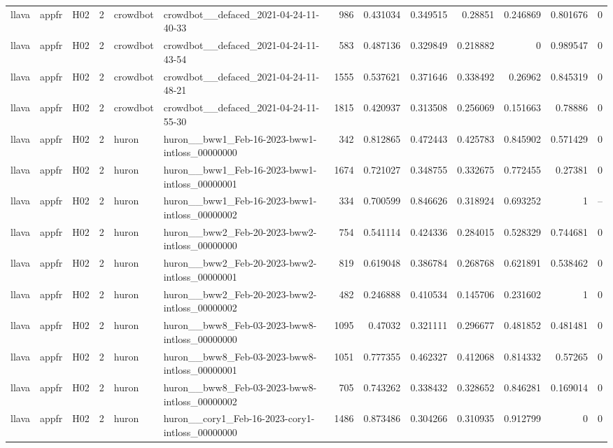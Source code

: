 \begin{longtable}{lllrllrrrrrrr}
llava & appfr & H02 & 2 & crowdbot & crowdbot\_\_defaced\_2021-04-24-11-40-33 & 986 & 0.431034 & 0.349515 & 0.28851 & 0.246869 & 0.801676 & 0 \\
llava & appfr & H02 & 2 & crowdbot & crowdbot\_\_defaced\_2021-04-24-11-43-54 & 583 & 0.487136 & 0.329849 & 0.218882 & 0 & 0.989547 & 0 \\
llava & appfr & H02 & 2 & crowdbot & crowdbot\_\_defaced\_2021-04-24-11-48-21 & 1555 & 0.537621 & 0.371646 & 0.338492 & 0.26962 & 0.845319 & 0 \\
llava & appfr & H02 & 2 & crowdbot & crowdbot\_\_defaced\_2021-04-24-11-55-30 & 1815 & 0.420937 & 0.313508 & 0.256069 & 0.151663 & 0.78886 & 0 \\
llava & appfr & H02 & 2 & huron & huron\_\_bww1\_Feb-16-2023-bww1-intloss\_00000000 & 342 & 0.812865 & 0.472443 & 0.425783 & 0.845902 & 0.571429 & 0 \\
llava & appfr & H02 & 2 & huron & huron\_\_bww1\_Feb-16-2023-bww1-intloss\_00000001 & 1674 & 0.721027 & 0.348755 & 0.332675 & 0.772455 & 0.27381 & 0 \\
llava & appfr & H02 & 2 & huron & huron\_\_bww1\_Feb-16-2023-bww1-intloss\_00000002 & 334 & 0.700599 & 0.846626 & 0.318924 & 0.693252 & 1 & -- \\
llava & appfr & H02 & 2 & huron & huron\_\_bww2\_Feb-20-2023-bww2-intloss\_00000000 & 754 & 0.541114 & 0.424336 & 0.284015 & 0.528329 & 0.744681 & 0 \\
llava & appfr & H02 & 2 & huron & huron\_\_bww2\_Feb-20-2023-bww2-intloss\_00000001 & 819 & 0.619048 & 0.386784 & 0.268768 & 0.621891 & 0.538462 & 0 \\
llava & appfr & H02 & 2 & huron & huron\_\_bww2\_Feb-20-2023-bww2-intloss\_00000002 & 482 & 0.246888 & 0.410534 & 0.145706 & 0.231602 & 1 & 0 \\
llava & appfr & H02 & 2 & huron & huron\_\_bww8\_Feb-03-2023-bww8-intloss\_00000000 & 1095 & 0.47032 & 0.321111 & 0.296677 & 0.481852 & 0.481481 & 0 \\
llava & appfr & H02 & 2 & huron & huron\_\_bww8\_Feb-03-2023-bww8-intloss\_00000001 & 1051 & 0.777355 & 0.462327 & 0.412068 & 0.814332 & 0.57265 & 0 \\
llava & appfr & H02 & 2 & huron & huron\_\_bww8\_Feb-03-2023-bww8-intloss\_00000002 & 705 & 0.743262 & 0.338432 & 0.328652 & 0.846281 & 0.169014 & 0 \\
llava & appfr & H02 & 2 & huron & huron\_\_cory1\_Feb-16-2023-cory1-intloss\_00000000 & 1486 & 0.873486 & 0.304266 & 0.310935 & 0.912799 & 0 & 0 \\

\end{longtable}
